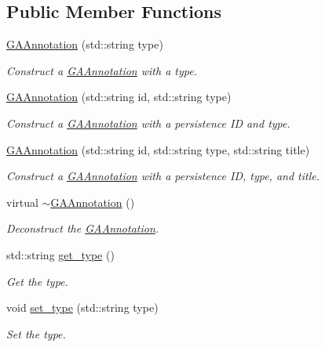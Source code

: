 \subsection*{Public Member Functions}
\begin{DoxyCompactItemize}
\item 
\hyperlink{class_g_a_annotation_a71e9337bdd11b745c244cb4daa370cf6}{G\+A\+Annotation} (std\+::string type)
\begin{DoxyCompactList}\small\item\em Construct a \hyperlink{class_g_a_annotation}{G\+A\+Annotation} with a type. \end{DoxyCompactList}\item 
\hyperlink{class_g_a_annotation_aa901f786bad351fe2bf19c734e6c3c92}{G\+A\+Annotation} (std\+::string id, std\+::string type)
\begin{DoxyCompactList}\small\item\em Construct a \hyperlink{class_g_a_annotation}{G\+A\+Annotation} with a persistence ID and type. \end{DoxyCompactList}\item 
\hyperlink{class_g_a_annotation_ae254750729165778f74a3d0313305eae}{G\+A\+Annotation} (std\+::string id, std\+::string type, std\+::string title)
\begin{DoxyCompactList}\small\item\em Construct a \hyperlink{class_g_a_annotation}{G\+A\+Annotation} with a persistence ID, type, and title. \end{DoxyCompactList}\item 
virtual \hyperlink{class_g_a_annotation_a68dbc2ee292a52692c33edd0b671544a}{$\sim$\+G\+A\+Annotation} ()
\begin{DoxyCompactList}\small\item\em Deconstruct the \hyperlink{class_g_a_annotation}{G\+A\+Annotation}. \end{DoxyCompactList}\item 
std\+::string \hyperlink{class_g_a_annotation_a6a5e4d1a8273090181ef60cbe06bf7c1}{get\+\_\+type} ()
\begin{DoxyCompactList}\small\item\em Get the type. \end{DoxyCompactList}\item 
void \hyperlink{class_g_a_annotation_a89552ebe856f6a6c0844e9d67237df45}{set\+\_\+type} (std\+::string type)
\begin{DoxyCompactList}\small\item\em Set the type. \end{DoxyCompactList}\item 

\end{DoxyCompactItemize}
